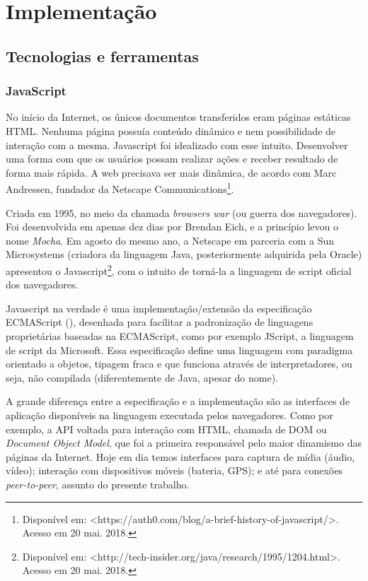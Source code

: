 \chapter[Implementação]{Implementação}\label{chap:implementacao}

\section{Tecnologias e ferramentas}

\subsection{JavaScript}

No início da Internet, os únicos documentos transferidos eram páginas estáticas HTML. Nenhuma página possuía conteúdo dinâmico e nem possibilidade de interação com a mesma. Javascript foi idealizado com esse intuito. Desenvolver uma forma com que os usuários possam realizar ações e receber resultado de forma mais rápida. A web precisava ser mais dinâmica, de acordo com Marc Andressen, fundador da Netscape Communications\footnote{Disponível em: <https://auth0.com/blog/a-brief-history-of-javascript/>. Acesso em 20 mai. 2018.}.

Criada em 1995, no meio da chamada \textit{browsers war} (ou guerra dos navegadores). Foi desenvolvida em apenas dez dias por Brendan Eich, e a princípio levou o nome \textit{Mocha}. Em agosto do mesmo ano, a Netscape em parceria com a Sun Microsystems (criadora da linguagem Java, posteriormente adquirida pela Oracle) apresentou o  Javascript\footnote{Disponível em: <http://tech-insider.org/java/research/1995/1204.html>. Acesso em 20 mai. 2018.}, com o intuito de torná-la a linguagem de script oficial dos navegadores.

Javascript na verdade é uma implementação/extensão da especificação ECMAScript (\cite{ecmascript}), desenhada para facilitar a padronização de  linguagens proprietárias baseadas na ECMAScript, como por exemplo JScript, a linguagem de script da Microsoft. Essa especificação define uma linguagem com paradigma orientado a objetos, tipagem fraca e que funciona através de interpretadores, ou seja, não compilada (diferentemente de Java, apesar do nome).

A grande diferença entre a especificação e a implementação são as interfaces de aplicação disponíveis na linguagem executada pelos navegadores. Como por exemplo, a API voltada para interação com HTML, chamada de DOM ou \textit{Document Object Model}, que foi a primeira responsável pelo maior dinamismo das páginas da Internet. Hoje em dia temos interfaces para captura de mídia (áudio, vídeo); interação com dispositivos móveis (bateria, GPS); e até para conexões \textit{peer-to-peer}, assunto do presente trabalho.

